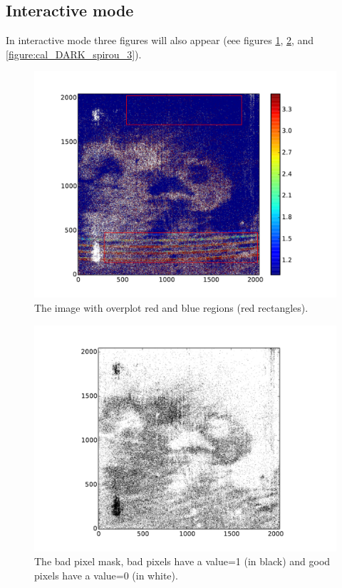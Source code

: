\begin{lstlisting}[style=text]
\end{lstlisting}

\subsection{Interactive mode}

\noindent In interactive mode three figures will also appear (eee figures \ref{figure:cal_DARK_spirou_1}, \ref{figure:cal_DARK_spirou_2}, and \ref{figure:cal_DARK_spirou_3}).

\begin{figure}
\begin{center}
\includegraphics[width=.8\textwidth]{figures/cal_DARK_spirou_1.pdf}
\caption{The image with overplot red and blue regions (red rectangles). \label{figure:cal_DARK_spirou_1}}
\end{center}
\end{figure}

\begin{figure}
\begin{center}
\includegraphics[width=.8\textwidth]{figures/cal_DARK_spirou_2.pdf}
\caption{The bad pixel mask, bad pixels have a value=1 (in black) and good pixels have a value=0 (in white). \label{figure:cal_DARK_spirou_2}}
\end{center}
\end{figure}


